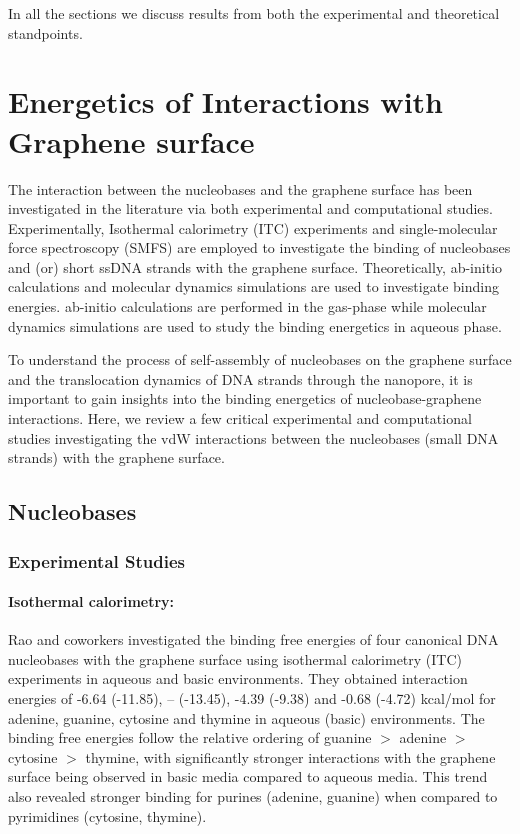 In all the sections we discuss results from both the experimental and theoretical standpoints.

\section{Energetics of Interactions with Graphene surface}
The interaction between the nucleobases and the graphene surface has been investigated in the literature via both experimental and computational studies. Experimentally, Isothermal calorimetry (ITC)  experiments and single-molecular force spectroscopy (SMFS) are employed to investigate the binding of nucleobases and (or) short ssDNA strands with the graphene surface. Theoretically, ab-initio calculations and molecular dynamics simulations are used to investigate binding energies. ab-initio calculations are performed in the gas-phase while molecular dynamics simulations are used to study the binding energetics in aqueous phase. 

To understand the process of self-assembly of nucleobases on the graphene surface and the translocation dynamics of DNA strands through the nanopore, it is important to gain insights into the binding energetics of nucleobase-graphene interactions. Here, we review a few critical experimental and computational studies investigating the vdW interactions between the nucleobases (small DNA strands) with the graphene surface.

\subsection{Nucleobases}
\subsubsection{Experimental Studies}
\paragraph{Isothermal calorimetry:} Rao and coworkers investigated the binding free energies of four canonical DNA nucleobases with the graphene surface using isothermal calorimetry (ITC) experiments in aqueous and basic environments.\supercite{varghese_binding_2009} They obtained interaction energies of -6.64 (-11.85), -- (-13.45), -4.39 (-9.38) and -0.68 (-4.72) kcal/mol for adenine, guanine, cytosine and thymine in aqueous (basic) environments. The binding free energies follow the relative ordering of guanine $>$ adenine $>$ cytosine $>$ thymine, with significantly stronger interactions with the graphene surface being observed in basic media compared to aqueous media. This trend also revealed stronger binding for purines (adenine, guanine) when compared to pyrimidines (cytosine, thymine).

